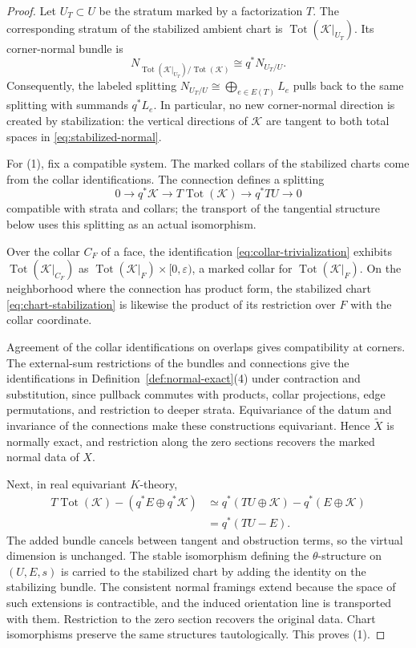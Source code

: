 \documentclass[11pt,letterpaper,twoside]{article}
\theoremstyle{plain}
\theoremstyle{definition}
\theoremstyle{remark}
\begin{document}
\begin{proof}
Let \(U_T\subset U\) be the stratum marked by a factorization \(T\).  The corresponding stratum of the stabilized ambient chart is \(\operatorname{Tot}(\mathcal K|_{U_T})\).  Its corner-normal bundle is
\begin{equation}\label{eq:stabilized-normal}
 N_{\operatorname{Tot}(\mathcal K|_{U_T})/\operatorname{Tot}(\mathcal K)}
 \cong q^*N_{U_T/U}.
\end{equation}
Consequently, the labeled splitting
\(
N_{U_T/U}\cong\bigoplus_{e\in E(T)}L_e
\)
pulls back to the same splitting with summands \(q^*L_e\).  In particular, no new corner-normal direction is created by stabilization: the vertical directions of \(\mathcal K\) are tangent to both total spaces in \eqref{eq:stabilized-normal}.

For (1), fix a compatible system.  The marked collars of the stabilized charts come from the collar identifications.  The connection defines a splitting
\[
 0\longrightarrow q^*\mathcal K
 \longrightarrow T\operatorname{Tot}(\mathcal K)
 \longrightarrow q^*TU
 \longrightarrow0
\]
compatible with strata and collars; the transport of the tangential structure below uses this splitting as an actual isomorphism.

Over the collar \(C_F\) of a face, the identification \eqref{eq:collar-trivialization} exhibits \(\operatorname{Tot}(\mathcal K|_{C_F})\) as \(\operatorname{Tot}(\mathcal K|_F)\times[0,\varepsilon)\), a marked collar for \(\operatorname{Tot}(\mathcal K|_F)\).  On the neighborhood where the connection has product form, the stabilized chart \eqref{eq:chart-stabilization} is likewise the product of its restriction over \(F\) with the collar coordinate.

Agreement of the collar identifications on overlaps gives compatibility at corners.  The external-sum restrictions of the bundles and connections give the identifications in Definition~\ref{def:normal-exact}(4) under contraction and substitution, since pullback commutes with products, collar projections, edge permutations, and restriction to deeper strata.  Equivariance of the datum and invariance of the connections make these constructions equivariant.  Hence \(\widetilde X\) is normally exact, and restriction along the zero sections recovers the marked normal data of \(X\).

Next, in real equivariant \(K\)-theory,
\begin{align}
 T\operatorname{Tot}(\mathcal K)-\left(q^*E\oplus q^*\mathcal K\right)
 &\simeq q^*(TU\oplus \mathcal K)-q^*(E\oplus \mathcal K)\\
 &=q^*(TU-E).
\end{align}
The added bundle cancels between tangent and obstruction terms, so the virtual dimension is unchanged.  The stable isomorphism defining the \(\theta\)-structure on \((U,E,s)\) is carried to the stabilized chart by adding the identity on the stabilizing bundle.  The consistent normal framings extend because the space of such extensions is contractible, and the induced orientation line is transported with them.  Restriction to the zero section recovers the original data.  Chart isomorphisms preserve the same structures tautologically.  This proves (1).


\end{proof}
\end{document}
